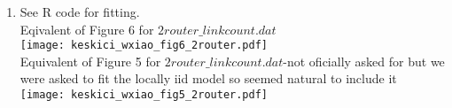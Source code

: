 \documentclass[paper=a4, fontsize=11pt]{scrartcl}
\begin{document}
\begin{enumerate}
\begin{enumerate}[1]
      \item See R code for fitting.\\
      Eqivalent of Figure 6 for $2router\_linkcount.dat$\\
      \texttt{[image: keskici\_wxiao\_fig6\_2router.pdf]}\\
      Equivalent of Figure 5 for $2router\_linkcount.dat$-not oficially asked for but we were asked to fit
      the locally iid model so seemed natural to include it\\
      \texttt{[image: keskici\_wxiao\_fig5\_2router.pdf]}

    \end{enumerate}
\end{enumerate}
\end{document}
